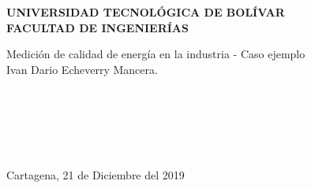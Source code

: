 \thispagestyle{empty}
\null

\begin{center}
  {\bf UNIVERSIDAD TECNOLÓGICA DE BOLÍVAR}\\
  \vfill
  {\bf FACULTAD DE INGENIERÍAS}
\end{center}

\vfill
\vfill
\vfill

 \expandafter{Medición de calidad de energía en la industria - Caso ejemplo}\\
\vfill
{} Ivan Dario Echeverry Mancera.\\

\vfill
\vfill
\vfill
\vfill
\vfill

\signature{Jurado}\\

\vfill
\vfill
\vfill
\vfill
\vfill

\signature{Jurado}\\

\vfill
\vfill
\vfill
\vfill
\vfill

\signature{Director: Víctor Manuel Garrido Arévalo}\\

\vfill
\vfill
\vfill
\vfill
\vfill
\vfill

\noindent\noindent Cartagena, 21 de Diciembre del 2019\\

\newpage

